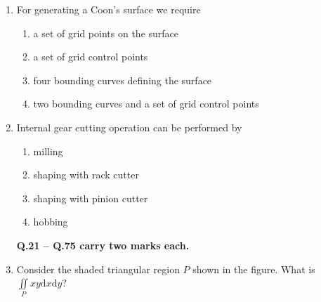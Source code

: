 \documentclass[journal,12pt,onecolumn]{IEEEtran}
\begin{document}
\begin{enumerate}
    \item For generating a Coon's surface we require
          \begin{enumerate}
              \item a set of grid points on the surface
              \item a set of grid control points
              \item four bounding curves defining the surface
              \item two bounding curves and a set of grid control points
          \end{enumerate}

    \item Internal gear cutting operation can be performed by
          \begin{enumerate}
              \item milling
              \item shaping with rack cutter
              \item shaping with pinion cutter
              \item hobbing
          \end{enumerate}


          \large\textbf{Q.21 -- Q.75 carry two marks each.}
    \item Consider the shaded triangular region $P$ shown in the figure. What is $\iint\limits_P xy\mathrm{d}x\mathrm{d}y$?\\
          \begin{figure}[H]
              \centering
              \caption{}
              \label{q21}
          \end{figure}

          \begin{enumerate}
          \end{enumerate}


\end{enumerate}
\end{document}
